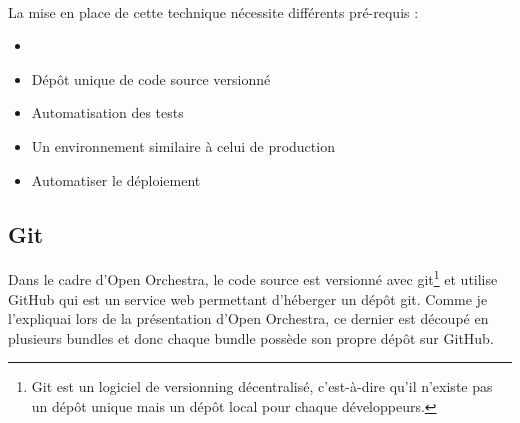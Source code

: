 \paragraph{}
La mise en place de cette technique nécessite différents pré-requis : 
\begin{itemize}
\item[]
\item Dépôt unique de code source versionné
\item Automatisation des tests
\item Un environnement similaire à celui de production
\item Automatiser le déploiement
\end{itemize}

\subsection{Git}
Dans le cadre d'Open Orchestra, le code source est versionné avec git\footnote{Git est un logiciel de versionning décentralisé, c'est-à-dire qu'il n'existe pas un dépôt unique mais un dépôt local pour chaque développeurs.} et utilise GitHub qui est un service web permettant d'héberger un dépôt git. Comme je l'expliquai lors de la présentation d'Open Orchestra, ce dernier est découpé en plusieurs bundles et donc chaque bundle possède son propre dépôt sur GitHub.

